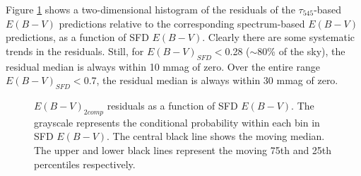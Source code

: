 \documentclass{emulateapj}
\begin{document}
Figure \ref{fig:resid} shows a two-dimensional histogram of the residuals of
the $\tau_{545}$-based $E(B-V)$ predictions relative to the corresponding
spectrum-based $E(B-V)$ predictions, as a function of SFD $E(B-V)$. Clearly 
there are some systematic trends in the residuals. Still, for 
$E(B-V)_{SFD}$$<$0.28 ($\sim$80\% of the sky), the residual median is always 
within 10 mmag of zero. Over the entire range $E(B-V)_{SFD}$$<$0.7, the 
residual median is always within 30 mmag of zero.

\begin{figure}
\begin{center}
\caption{\label{fig:resid} $E(B-V)_{2comp}$ residuals as a function of
SFD $E(B-V)$. The grayscale represents the conditional probability within each
bin in SFD $E(B-V)$. The central black line shows the moving median. The upper
and lower black lines represent the moving 75th and 25th percentiles 
respectively.}
\end{center}
\end{figure}




\end{document}
